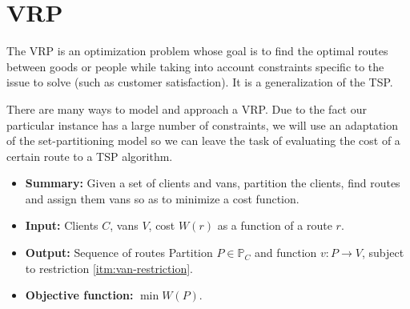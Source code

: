 \section{\texorpdfstring{\Acrlong*{VRP}}{Vehicle routing problem}} \label{algorithm-vrp}
The \acrfull*{VRP} is an optimization problem whose goal is to find the optimal routes between goods or people while taking into account constraints specific to the issue to solve (such as customer satisfaction). It is a generalization of the \acrshort{TSP}.\par
There are many ways to model and approach a \acrshort{VRP}. Due to the fact our particular instance has a large number of constraints, we will use an adaptation of the set-partitioning model \cite[p.~21-22]{optimal-vrp} so we can leave the task of evaluating the cost of a certain route to a \acrshort{TSP} algorithm.\par

\begin{itemize}
    \item \textbf{Summary:} Given a set of clients and vans, partition the clients, find routes and assign them vans so as to minimize a cost function.
    \item \textbf{Input:} Clients $C$, vans $V$, cost $W(r)$ as a function of a route $r$.
    \item \textbf{Output:} Sequence of routes Partition $P \in \mathbb{P}_C$ and function $v\colon P \rightarrow V$, subject to restriction \ref{itm:van-restriction}.
    \item \textbf{Objective function:} $\min W(P)$.
\end{itemize}




